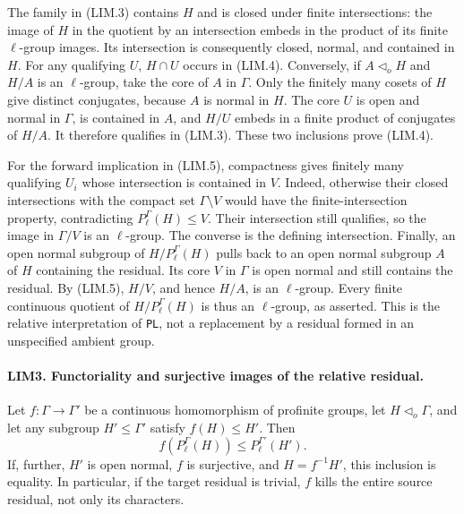 The family in (LIM.3) contains \(H\) and is closed under finite
intersections: the image of \(H\) in the quotient by an intersection
embeds in the product of its finite \(\ell\)-group images.
Its intersection is consequently closed, normal, and contained in \(H\).
For any qualifying \(U\), \(H\cap U\) occurs in (LIM.4).
Conversely, if \(A\triangleleft_o H\) and \(H/A\) is an \(\ell\)-group,
take the core of \(A\) in \(\Gamma\).  Only the finitely many cosets of
\(H\) give distinct conjugates, because \(A\) is normal in \(H\).
The core \(U\) is open and normal in \(\Gamma\), is contained in \(A\),
and \(H/U\) embeds in a finite product of conjugates of \(H/A\).
It therefore qualifies in (LIM.3).  These two inclusions prove (LIM.4).

For the forward implication in (LIM.5), compactness gives finitely many
qualifying \(U_i\) whose intersection is contained in \(V\).  Indeed,
otherwise their closed intersections with the compact set
\(\Gamma\setminus V\) would have the finite-intersection property,
contradicting \(P_\ell^\Gamma(H)\le V\).
Their intersection still qualifies, so the image in \(\Gamma/V\)
is an \(\ell\)-group.  The converse is the defining intersection.
Finally, an open normal subgroup of \(H/P_\ell^\Gamma(H)\) pulls back
to an open normal subgroup \(A\) of \(H\) containing the residual.
Its core \(V\) in \(\Gamma\) is open normal and still contains the
residual.  By (LIM.5), \(H/V\), and hence \(H/A\), is an \(\ell\)-group.
Every finite continuous quotient of \(H/P_\ell^\Gamma(H)\) is thus an
\(\ell\)-group, as asserted.
This is the relative interpretation of \texttt{PL}, not a replacement
by a residual formed in an unspecified ambient group.

\paragraph{LIM3. Functoriality and surjective images of the relative residual.}
\label{claim:LIM3}
Let \(f:\Gamma\to\Gamma'\) be a continuous homomorphism of profinite
groups, let \(H\triangleleft_o\Gamma\), and let any subgroup
\(H'\le\Gamma'\) satisfy \(f(H)\le H'\).  Then
\[
 f(P_\ell^\Gamma(H))\le P_\ell^{\Gamma'}(H').
 \tag{LIM.6}
\]
If, further, \(H'\) is open normal, \(f\) is surjective, and
\(H=f^{-1}H'\), this inclusion is equality.
In particular, if the target residual is trivial, \(f\) kills the
entire source residual, not only its characters.

